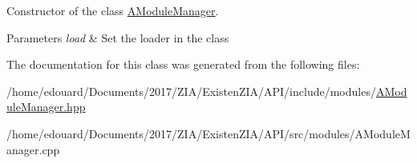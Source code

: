 Constructor of the class \mbox{\hyperlink{classxzia_1_1AModuleManager}{A\+Module\+Manager}}. 


\begin{DoxyParams}{Parameters}
{\em load} & Set the loader in the class \\
\hline
\end{DoxyParams}


The documentation for this class was generated from the following files\+:\begin{DoxyCompactItemize}
\item 
/home/edouard/\+Documents/2017/\+Z\+I\+A/\+Existen\+Z\+I\+A/\+A\+P\+I/include/modules/\mbox{\hyperlink{AModuleManager_8hpp}{A\+Module\+Manager.\+hpp}}\item 
/home/edouard/\+Documents/2017/\+Z\+I\+A/\+Existen\+Z\+I\+A/\+A\+P\+I/src/modules/A\+Module\+Manager.\+cpp\end{DoxyCompactItemize}
